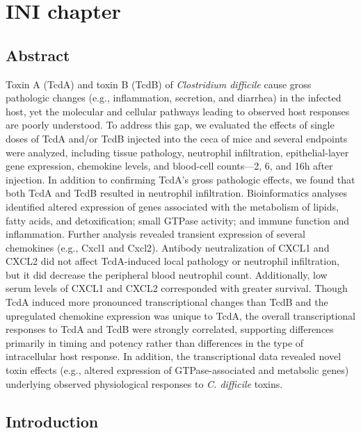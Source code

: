 \doublespacing

\chapter{ INI chapter }

\section{Abstract}

Toxin A (TcdA) and toxin B (TcdB) of \textit{Clostridium difficile} cause gross 
pathologic changes (e.g., inflammation, secretion, and diarrhea) in the infected
host, yet the molecular and cellular pathways leading to observed host responses
are poorly understood. To address this gap, we evaluated the effects of single
doses of TcdA and/or TcdB injected into the ceca of mice and several endpoints
were analyzed, including tissue pathology, neutrophil infiltration, epithelial-layer 
gene expression, chemokine levels, and blood-cell counts—2, 6, and 16h after
injection. In addition to confirming TcdA's gross pathologic effects, we 
found that both TcdA and TcdB resulted in neutrophil infiltration. Bioinformatics 
analyses identified altered expression of genes associated with the metabolism 
of lipids, fatty acids, and detoxification; small GTPase activity; and immune
function and inflammation. Further analysis revealed transient expression of 
several chemokines (e.g., Cxcl1 and Cxcl2). Antibody neutralization of CXCL1
and CXCL2 did not affect TcdA-induced local pathology or neutrophil 
infiltration, but it did decrease the peripheral blood neutrophil count. 
Additionally, low serum levels of CXCL1 and CXCL2 corresponded with greater 
survival. Though TcdA induced more pronounced transcriptional changes than 
TcdB and the upregulated chemokine expression was unique to TcdA, the 
overall transcriptional responses to TcdA and TcdB were strongly correlated, 
supporting differences primarily in timing and potency rather than differences 
in the type of intracellular host response. In addition, the transcriptional 
data revealed novel toxin effects (e.g., altered expression of GTPase-associated 
and metabolic genes) underlying observed physiological responses to 
\textit{C. difficile} toxins.

\section{Introduction}

